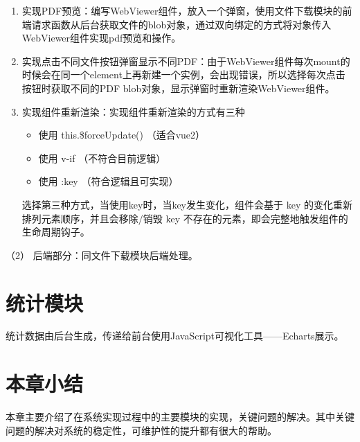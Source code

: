 \begin{enumerate}[label=\circled{\arabic*}]
  \item 实现PDF预览：编写WebViewer组件，放入一个弹窗，使用文件下载模块的前端请求函数从后台获取文件的blob对象，通过双向绑定的方式将对象传入WebViewer组件实现pdf预览和操作。
  \item 实现点击不同文件按钮弹窗显示不同PDF：由于WebViewer组件每次mount的时候会在同一个element上再新建一个实例，会出现错误，所以选择每次点击按钮时获取不同的PDF blob对象，显示弹窗时重新渲染WebViewer组件。
  \item 实现组件重新渲染：实现组件重新渲染的方式有三种
        \begin{itemize}
          \item 使用 this.\$forceUpdate() （适合vue2）
          \item 使用 v-if （不符合目前逻辑）
          \item 使用 :key （符合逻辑且可实现）
        \end{itemize}
        选择第三种方式，当使用key时，当key发生变化，组件会基于 key 的变化重新排列元素顺序，并且会移除/销毁 key 不存在的元素，即会完整地触发组件的生命周期钩子。
\end{enumerate}

（2） 后端部分：同文件下载模块后端处理。


\section{统计模块}

统计数据由后台生成，传递给前台使用JavaScript可视化工具——Echarts展示。


\section{本章小结}

本章主要介绍了在系统实现过程中的主要模块的实现，关键问题的解决。其中关键问题的解决对系统的稳定性，可维护性的提升都有很大的帮助。